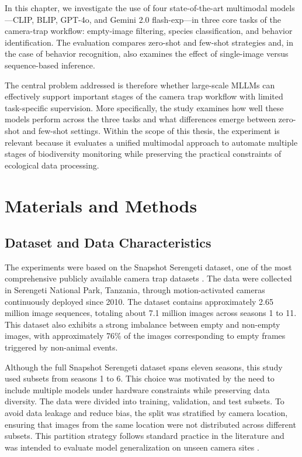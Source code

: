 In this chapter, we investigate the use of four state-of-the-art multimodal models---CLIP, BLIP, GPT-4o, and Gemini 2.0 flash-exp---in three core tasks of the camera-trap workflow: empty-image filtering, species classification, and behavior identification. The evaluation compares zero-shot and few-shot strategies and, in the case of behavior recognition, also examines the effect of single-image versus sequence-based inference.

The central problem addressed is therefore whether large-scale MLLMs can effectively support important stages of the camera trap workflow with limited task-specific supervision. More specifically, the study examines how well these models perform across the three tasks and what differences emerge between zero-shot and few-shot settings. Within the scope of this thesis, the experiment is relevant because it evaluates a unified multimodal approach to automate multiple stages of biodiversity monitoring while preserving the practical constraints of ecological data processing.

\section{Materials and Methods}

\subsection{Dataset and Data Characteristics}

The experiments were based on the Snapshot Serengeti dataset, one of the most comprehensive publicly available camera trap datasets \citep{swanson2015snapshot}. The data were collected in Serengeti National Park, Tanzania, through motion-activated cameras continuously deployed since 2010. The dataset contains approximately 2.65 million image sequences, totaling about 7.1 million images across seasons 1 to 11. This dataset also exhibits a strong imbalance between empty and non-empty images, with approximately 76\% of the images corresponding to empty frames triggered by non-animal events.

Although the full Snapshot Serengeti dataset spans eleven seasons, this study used subsets from seasons 1 to 6. This choice was motivated by the need to include multiple models under hardware constraints while preserving data diversity. The data were divided into training, validation, and test subsets. To avoid data leakage and reduce bias, the split was stratified by camera location, ensuring that images from the same location were not distributed across different subsets. This partition strategy follows standard practice in the literature and was intended to evaluate model generalization on unseen camera sites \citep{beery2018recognition,schneider2020three}.

